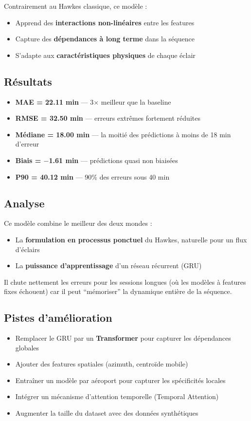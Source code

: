 \documentclass[11pt,a4paper]{article}
\newenvironment{keybox}[1]
  {\begin{tcolorbox}[colback=meteoGray,colframe=meteoBlue,title={\textbf{#1}},
    fonttitle=\small, boxrule=0.6pt, arc=3pt]}
  {\end{tcolorbox}}
\begin{document}
Contrairement au Hawkes classique, ce modèle :
\begin{itemize}[noitemsep]
  \item Apprend des \textbf{interactions non-linéaires} entre les features
  \item Capture des \textbf{dépendances à long terme} dans la séquence
  \item S'adapte aux \textbf{caractéristiques physiques} de chaque éclair
\end{itemize}

\subsection{Résultats}
\begin{keybox}{Métriques Neural Hawkes (GRU) — \textcolor{meteoRed}{Meilleur modèle}}
\begin{itemize}[noitemsep]
  \item \textbf{MAE = 22.11 min} — 3$\times$ meilleur que la baseline
  \item \textbf{RMSE = 32.50 min} — erreurs extrêmes fortement réduites
  \item \textbf{Médiane = 18.00 min} — la moitié des prédictions à moins de 18 min d'erreur
  \item \textbf{Biais = $-$1.61 min} — prédictions quasi non biaisées
  \item \textbf{P90 = 40.12 min} — 90\% des erreurs sous 40 min
\end{itemize}
\end{keybox}

\subsection{Analyse}
Ce modèle combine le meilleur des deux mondes :
\begin{itemize}
  \item La \textbf{formulation en processus ponctuel} du Hawkes, naturelle pour un flux d'éclairs
  \item La \textbf{puissance d'apprentissage} d'un réseau récurrent (GRU)
\end{itemize}
Il chute nettement les erreurs pour les sessions longues (où les modèles à features fixes échouent)
car il peut ``mémoriser'' la dynamique entière de la séquence.

\subsection{Pistes d'amélioration}
\begin{itemize}[noitemsep]
  \item Remplacer le GRU par un \textbf{Transformer} pour capturer les dépendances globales
  \item Ajouter des features spatiales (azimuth, centroïde mobile)
  \item Entraîner un modèle par aéroport pour capturer les spécificités locales
  \item Intégrer un mécanisme d'attention temporelle (Temporal Attention)
  \item Augmenter la taille du dataset avec des données synthétiques
\end{itemize}
\end{document}
